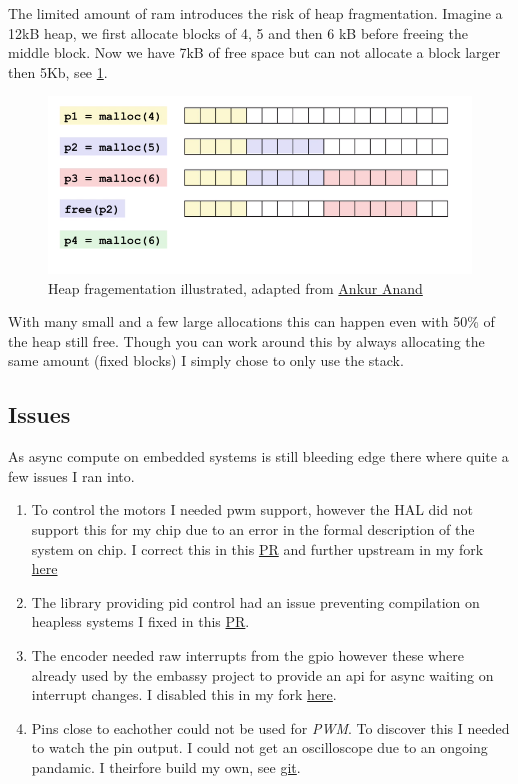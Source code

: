 \documentclass[lang=en, hanging-titles=true]{skrapport}
\begin{document}
The limited amount of ram introduces the risk of heap fragmentation. Imagine a 12kB heap, we first allocate blocks of 4, 5 and then 6 kB before freeing the middle block. Now we have 7kB of free space but can not allocate a block larger then 5Kb, see \cref{fig:heap}. %
%
\begin{figure}[htbp]
	\centering
	\includegraphics[width=0.9\linewidth]{figs/heapfrag}
	\caption{Heap fragementation illustrated, adapted from \href{https://medium.com/@ankur\_anand/a-visual-guide-to-golang-memory-allocator-from-ground-up-e132258453ed}{Ankur Anand}}
	\label{fig:heap}
\end{figure}
%
With many small and a few large allocations this can happen even with 50\% of the heap still free. Though you can work around this by always allocating the same amount (fixed blocks) I simply chose to only use the stack.

\subsection{Issues}
As async compute on embedded systems is still bleeding edge there where quite a few issues I ran into. 

\begin{enumerate}
	\item To control the motors I needed pwm support, however the HAL did not support this for my chip due to an error in the formal description of the system on chip. I correct this in this \href{https://github.com/nrf-rs/nrf52832-pac/pull/19}{PR} and further upstream in my fork \href{https://github.com/dskleingeld/nrf-hal}{here}
	\item The library providing pid control had an issue preventing compilation on heapless systems I fixed in this \href{https://github.com/yoshuawuyts/pid-lite/pull/1}{PR}.
	\item The encoder needed raw interrupts from the gpio however these where already used by the embassy project to provide an api for async waiting on interrupt changes. I disabled this in my fork \href{https://github.com/dskleingeld/embassy}{here}.
	\item Pins close to eachother could not be used for \textit{PWM}. To discover this I needed to watch the pin output. I could not get an oscilloscope due to an ongoing pandamic. I theirfore build my own, see \href{https://github.com/dskleingeld/rustyscopes}{git}.
\end{enumerate}
\end{document}
